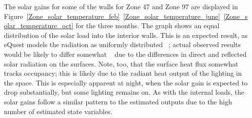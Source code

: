 The solar gains for some of the walls for Zone 47 and Zone 97 are displayed in Figure~\ref{Zone_solar_temperature_feb}~\ref{Zone_solar_temperature_june}~\ref{Zone_solar_temperature_oct} for the three months. The graph shows an equal distribution of the solar load into the interior walls. This is an expected result, as eQuest models the radiation as uniformly distributed ~\citep{doe2016energyplus}; actual observed results would be likely to differ somewhat ~\citep{he2016simplified} due to the differences in direct and reflected solar radiation on the surfaces.  Note, too, that the surface heat flux somewhat tracks occupancy; this is likely due to the radiant heat output of the lighting in the space.  This is especially apparent at night, when the solar gain is expected to drop substantially, but some lighting remains on.  As with the internal loads, the solar gains follow a similar pattern to the estimated outputs due to the high number of estimated state variables. 

